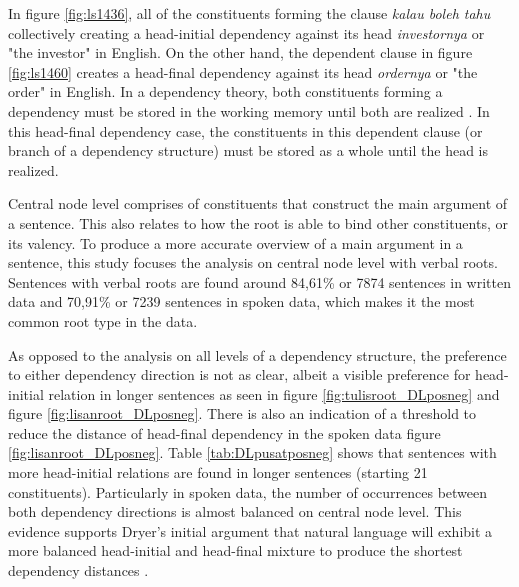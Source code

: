 \documentclass[10pt, a4paper, conference, compsocconf]{IEEEtran}
\begin{document}
In figure \ref{fig:ls1436}, all of the constituents forming the clause \textit{kalau boleh tahu} collectively creating a head-initial dependency against its head \textit{investornya} or "the investor" in English. On the other hand, the dependent clause in figure \ref{fig:ls1460} creates a head-final dependency against its head \textit{ordernya} or "the order" in English. In a dependency theory, both constituents forming a dependency must be stored in the working memory until both are realized \cite{tesniere1959elements}. In this head-final dependency case, the constituents in this dependent clause (or branch of a dependency structure) must be stored as a whole until the head is realized. 

Central node level comprises of constituents that construct the main argument of a sentence. This also relates to how the root is able to bind other constituents, or its valency. To produce a more accurate overview of a main argument in a sentence, this study focuses the analysis on central node level with verbal roots. Sentences with verbal roots are found around 84,61\% or 7874 sentences in written data and 70,91\% or 7239 sentences in spoken data, which makes it the most common root type in the data.

As opposed to the analysis on all levels of a dependency structure, the preference to either dependency direction is not as clear, albeit a visible preference for head-initial relation in longer sentences as seen in figure \ref{fig:tulisroot_DLposneg} and figure \ref{fig:lisanroot_DLposneg}. There is also an indication of a threshold to reduce the distance of head-final dependency in the spoken data figure \ref{fig:lisanroot_DLposneg}. Table \ref{tab:DLpusatposneg} shows that sentences with more head-initial relations are found in longer sentences (starting 21 constituents). Particularly in spoken data, the number of occurrences between both dependency directions is almost balanced on central node level. This evidence supports Dryer's initial argument that natural language will exhibit a more balanced head-initial and head-final mixture to produce the shortest dependency distances \cite{dryer1992greenbergian}.
\end{document}
